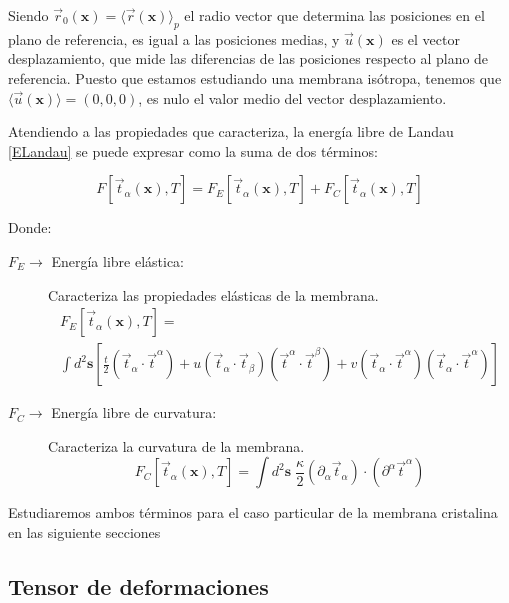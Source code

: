 Siendo $\vec{r}_0(\mathbf{x})=\langle\vec{r}(\mathbf{x}) \rangle_p$ el radio
vector que determina las posiciones en el plano de referencia, es igual a las
posiciones medias, y $\vec{u}(\mathbf{x})$ es el vector desplazamiento, que
mide las diferencias de las posiciones respecto al plano de referencia. Puesto
que estamos estudiando una membrana isótropa, tenemos que
$\langle\vec{u}(\mathbf{x}) \rangle=(0,0,0)$, es nulo el valor medio del
vector desplazamiento.

Atendiendo a las propiedades que caracteriza, la energía libre de Landau
\eqref{ELandau} se puede expresar como la suma de dos términos:

\begin{equation}
 F[\vec{t}_{\alpha}(\mathbf{x}),T]= F_E[\vec{t}_{\alpha}(\mathbf{x}),T]+F_C[\vec{t}_{\alpha}(\mathbf{x}),T]
\end{equation}

Donde:
\begin{description}
\item[ $F_E\rightarrow $ Energía libre elástica:] Caracteriza las propiedades elásticas de la membrana.
  \begin{multline}\label{ELandau_elastica}
    F_E[\vec{t}_{\alpha}(\mathbf{x}),T]=\\\int d^2\mathbf{s}
    \left[
      \frac{t}{2}(\vec{t}_{\alpha}\cdot\vec{t}^{\alpha})+
      u(\vec{t}_{\alpha}\cdot\vec{t}_{\beta})(\vec{t}^{\alpha}\cdot\vec{t}^{\beta})+
      v(\vec{t}_{\alpha}\cdot\vec{t}^{\alpha})(\vec{t}_{\alpha}\cdot\vec{t}^{\alpha})\right]
  \end{multline}
\item[ $F_C\rightarrow $ Energía libre de curvatura:] Caracteriza la curvatura
  de la membrana. 
  \begin{equation}\label{ELandau_curvatura}
       F_C[\vec{t}_{\alpha}(\mathbf{x}),T]=\int d^2\mathbf{s}\; 
      \frac{\kappa}{2}(\partial_{\alpha}\vec{t}_{\alpha})\cdot(\partial^{\alpha}\vec{t}^{\alpha})
  \end{equation}
\end{description}

Estudiaremos ambos términos para el caso particular de la membrana cristalina
en las siguiente secciones

\subsection{Tensor de deformaciones}

